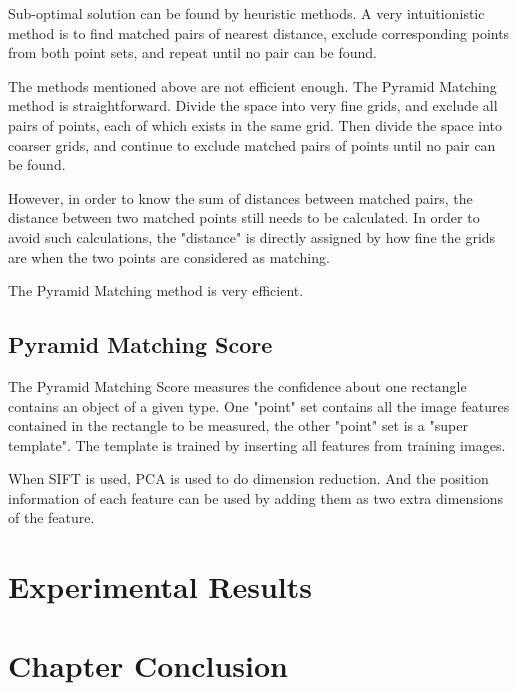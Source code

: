 Sub-optimal solution can be found by heuristic methods. A very intuitionistic method is to find matched pairs of nearest distance, exclude corresponding points from both point sets, and repeat until no pair can be found.

The methods mentioned above are not efficient enough. The Pyramid Matching method is straightforward. Divide the space into very fine grids, and exclude all pairs of points, each of which exists in the same grid. Then divide the space into coarser grids, and continue to exclude matched pairs of points until no pair can be found.

However, in order to know the sum of distances between matched pairs, the distance between two matched points still needs to be calculated. In order to avoid such calculations, the "distance" is directly assigned by how fine the grids are when the two points are considered as matching.

The Pyramid Matching method is very efficient.

\subsection{Pyramid Matching Score}

The Pyramid Matching Score measures the confidence about one rectangle contains an object of a given type. One "point" set contains all the image features contained in the rectangle to be measured, the other "point" set is a "super template". The template is trained by inserting all features from training images.

When SIFT is used, PCA is used to do dimension reduction. And the position information of each feature can be used by adding them as two extra dimensions of the feature.

\section{Experimental Results}
\label{exp5}

\section{Chapter Conclusion}
\label{conc5}
